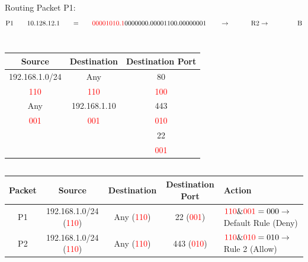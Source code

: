 \documentclass{article}
\begin{document}
        \begin{center}
            Routing Packet P1:
            \begin{align*}
            \text{P1} & ~~~ && 10.128.12.1 &&& = &&&& \textcolor{red}{00001010.1}0000000.00001100.00000001 &&&&& \to\ &&&&&& \text{R2} \to\ &&&&&&& \text{B} \\
            \end{align*}
        \end{center}

    \section{}
    \subsection{}
    \begin{center}
        \begin{tabular}{|c|c|c|}
            \hline
            Source & Destination & Destination Port \\
            \hline 
            192.168.1.0/24 & Any & 80 \\
            \textcolor{red}{110} & \textcolor{red}{110} & \textcolor{red}{100} \\
            \hline
            Any & 192.168.1.10 & 443 \\
            \textcolor{red}{001} & \textcolor{red}{001} & \textcolor{red}{010} \\
            \hline
            & & 22 \\
            & & \textcolor{red}{001} \\
            \hline
        \end{tabular}
    \end{center}


    
    \subsection{}
    \begin{tabular}{|c|c|c|c|l|}
        \hline
        Packet & Source & Destination & Destination Port & Action  \\
        \hline
        P1 & 192.168.1.0/24 (\textcolor{red}{110}) & Any (\textcolor{red}{110}) & 22 (\textcolor{red}{001}) & $\textcolor{red}{110} \& \textcolor{red}{001} = 000 \to$ Default Rule (Deny)  \\
        P2 & 192.168.1.0/24 (\textcolor{red}{110}) & Any (\textcolor{red}{110}) & 443 (\textcolor{red}{010}) & $\textcolor{red}{110} \& \textcolor{red}{010} = 010 \to$ Rule 2 (Allow)\\
        \hline
    \end{tabular}
    
\end{document}
